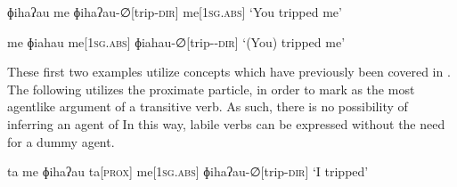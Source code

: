 \ex
\begingl
\glpreamble ɸihaʔau me
\endpreamble
ɸihaʔau-∅[trip\textsc{-dir}]
me[\textsc{1sg.abs}]
\glft `You tripped me'
\endgl
\xe

\ex
\begingl
\glpreamble me ɸiahau
\endpreamble
me[\textsc{1sg.abs}]
ɸiahau-∅[trip-\textsc{-dir}]
\glft `(You) tripped me'
\endgl
\xe

These first two examples utilize concepts which have previously been covered in . The following utilizes the proximate particle,  in order to mark  as the most agentlike argument of a transitive verb. As such, there is no possibility of inferring an agent of  In this way, labile verbs can be expressed without the need for a dummy agent.

\ex
\begingl
\glpreamble ta me ɸihaʔau
\endpreamble
ta[\textsc{prox}]
me[\textsc{1sg.abs}]
ɸihaʔau-∅[trip\textsc{-dir}]
\glft `I tripped'
\endgl
\xe

